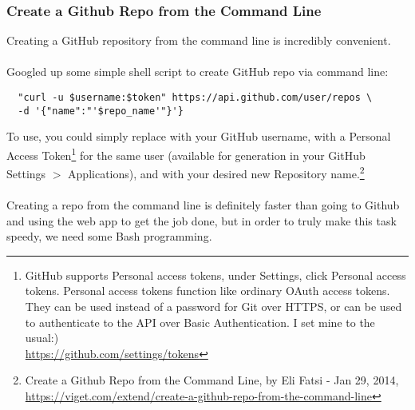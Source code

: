 \subsubsection{Create a Github Repo from the Command Line}
Creating a GitHub repository from the command line is incredibly
convenient.
\\
\\
Googled up some simple shell script to create GitHub repo via
command line:

\begin{verbatim}
  "curl -u $username:$token" https://api.github.com/user/repos \
  -d '{"name":"'$repo_name'"}'}
\end{verbatim}

\noindent To use, you could simply replace  with your
GitHub username, \cmd{\$token} with a Personal Access Token\footnote{GitHub
supports Personal access tokens, under Settings, click Personal access
tokens. Personal access tokens function like ordinary OAuth access tokens.
They can be used instead of a password for Git over HTTPS, or can be used
to authenticate to the API over Basic Authentication.  I set mine to the usual:)\\
\href{https://github.com/settings/tokens}{https://github.com/settings/tokens}}
for the same user (available for generation in your GitHub\\
Settings $>$ Applications), and  with your
desired new Repository name.\footnote{Create a Github Repo
from the Command Line, by Eli Fatsi - Jan 29, 2014,\\
\href{https://viget.com/extend/create-a-github-repo-from-the-command-line}{https://viget.com/extend/create-a-github-repo-from-the-command-line}}
\\
\\
Creating a repo from the command line is definitely faster
than going to Github and using the web app to get the job
done, but in order to truly make this task speedy, we need
some Bash programming.

